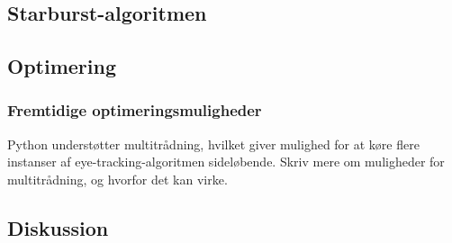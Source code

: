 \documentclass[rapport.tex]{subfiles}
\begin{document}
	\subsection{Starburst-algoritmen}
	\subsection{Optimering}
	
	\subsubsection{Fremtidige optimeringsmuligheder}
	Python understøtter multitrådning, hvilket giver mulighed for at køre flere instanser af eye-tracking-algoritmen sideløbende. Skriv mere om muligheder for multitrådning, og hvorfor det kan virke.
	\subsection{Diskussion}
		
\end{document}
